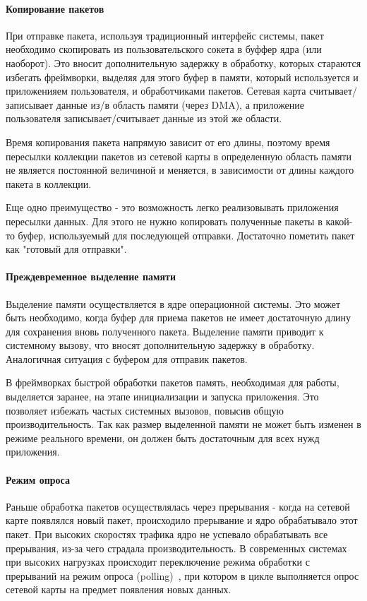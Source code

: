 \paragraph{Копирование пакетов}

При отправке пакета, используя традиционный интерфейс системы, пакет необходимо скопировать из пользовательского сокета в буффер ядра (или наоборот). Это вносит дополнительную задержку в обработку, которых стараются избегать фреймворки, выделяя для этого буфер в памяти, который используется и приложенияем пользователя, и обработчиками пакетов. Сетевая карта считывает/записывает данные из/в область памяти (через DMA), а приложение пользователя записывает/считывает данные из этой же области.

Время копирования пакета напрямую зависит от его длины, поэтому время пересылки коллекции пакетов из сетевой карты в определенную область памяти не является постоянной величиной и меняется, в зависимости от длины каждого пакета в коллекции.

Еще одно преимущество - это возможность легко реализовывать приложения пересылки данных. Для этого не нужно копировать полученные пакеты в какой-то буфер, используемый для последующей отправки. Достаточно пометить пакет как "готовый для отправки".

\paragraph{Преждевременное выделение памяти}

Выделение памяти осуществляется в ядре операционной системы. Это может быть необходимо, когда буфер для приема пакетов не имеет достаточную длину для сохранения вновь полученного пакета. Выделение памяти приводит к системному вызову, что вносят дополнительную задержку в обработку. Аналогичная ситуация с буфером для отправик пакетов.

В фреймворках быстрой обработки пакетов память, необходимая для работы, выделяется заранее, на этапе инициализации и запуска приложения. Это позволяет избежать частых системных вызовов, повысив общую производительность. Так как размер выделенной памяти не может быть изменен в режиме реального времени, он должен быть достаточным для всех нужд приложения.

\paragraph{Режим опроса}

Раньше обработка пакетов осуществлялась через прерывания - когда на сетевой карте появлялся новый пакет, происходило прерывание и ядро обрабатывало этот пакет. При высоких скоростях трафика  ядро не успевало обрабатывать все прерывания, из-за чего страдала производительность. В современных системах при высоких нагрузках происходит переключение режима обработки с прерываний на режим опроса (polling)~\cite{modern_os}, при котором в цикле выполняется опрос сетевой карты на предмет появления новых данных.

